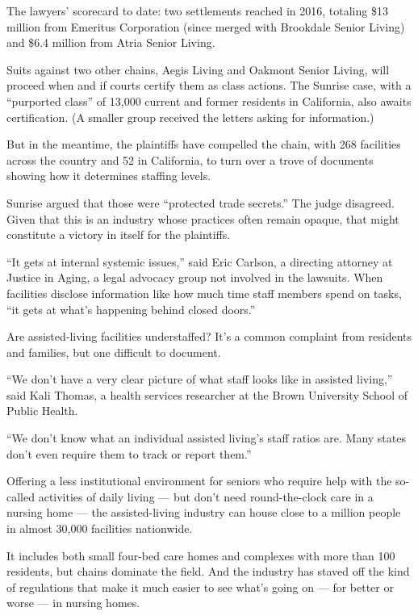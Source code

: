 The lawyers' scorecard to date: two settlements reached in 2016,
totaling \$13 million from Emeritus Corporation (since merged with
Brookdale Senior Living) and \$6.4 million from Atria Senior Living.

Suits against two other chains, Aegis Living and Oakmont Senior Living,
will proceed when and if courts certify them as class actions. The
Sunrise case, with a ``purported class'' of 13,000 current and former
residents in California, also awaits certification. (A smaller group
received the letters asking for information.)

But in the meantime, the plaintiffs have compelled the chain, with 268
facilities across the country and 52 in California, to turn over a trove
of documents showing how it determines staffing levels.

Sunrise argued that those were ``protected trade secrets.'' The judge
disagreed. Given that this is an industry whose practices often remain
opaque, that might constitute a victory in itself for the plaintiffs.

``It gets at internal systemic issues,'' said Eric Carlson, a directing
attorney at Justice in Aging, a legal advocacy group not involved in the
lawsuits. When facilities disclose information like how much time staff
members spend on tasks, ``it gets at what's happening behind closed
doors.''

Are assisted-living facilities understaffed? It's a common complaint
from residents and families, but one difficult to document.

``We don't have a very clear picture of what staff looks like in
assisted living,'' said Kali Thomas, a health services researcher at the
Brown University School of Public Health.

``We don't know what an individual assisted living's staff ratios are.
Many states don't even require them to track or report them.''

Offering a less institutional environment for seniors who require help
with the so-called activities of daily living --- but don't need
round-the-clock care in a nursing home --- the assisted-living industry
can house close to a million people in almost 30,000 facilities
nationwide.

It includes both small four-bed care homes and complexes with more than
100 residents, but chains dominate the field. And the industry has
staved off the kind of regulations that make it much easier to see
what's going on --- for better or worse --- in nursing homes.

